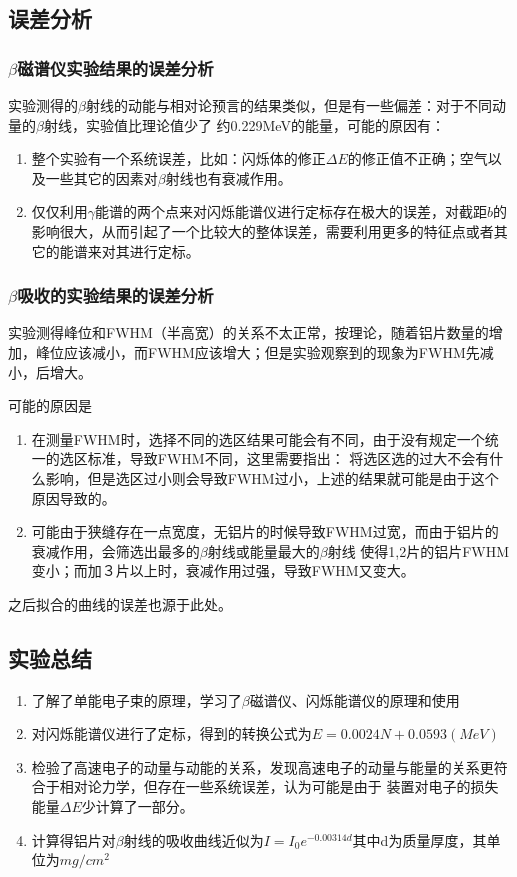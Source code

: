 \documentclass[a4paper,UTF8]{ctexart}
\begin{document}
\subsection{误差分析}

\subsubsection{$\beta$磁谱仪实验结果的误差分析}

实验测得的$\beta$射线的动能与相对论预言的结果类似，但是有一些偏差：对于不同动量的$\beta$射线，实验值比理论值少了
约0.229MeV的能量，可能的原因有：

\begin{enumerate}
    \item 整个实验有一个系统误差，比如：闪烁体的修正$\Delta E$的修正值不正确；空气以及一些其它的因素对$\beta$射线也有衰减作用。
    \item 仅仅利用$\gamma$能谱的两个点来对闪烁能谱仪进行定标存在极大的误差，对截距$b$的影响很大，从而引起了一个比较大的整体误差，需要利用更多的特征点或者其它的能谱来对其进行定标。
\end{enumerate}

\subsubsection{$\beta$吸收的实验结果的误差分析}

实验测得峰位和FWHM（半高宽）的关系不太正常，按理论，随着铝片数量的增加，峰位应该减小，而FWHM应该增大；但是实验观察到的现象为FWHM先减小，后增大。

可能的原因是

\begin{enumerate}
    \item 在测量FWHM时，选择不同的选区结果可能会有不同，由于没有规定一个统一的选区标准，导致FWHM不同，这里需要指出：
    将选区选的过大不会有什么影响，但是选区过小则会导致FWHM过小，上述的结果就可能是由于这个原因导致的。
    \item 可能由于狭缝存在一点宽度，无铝片的时候导致FWHM过宽，而由于铝片的衰减作用，会筛选出最多的$\beta$射线或能量最大的$\beta$射线
    使得1,2片的铝片FWHM变小；而加３片以上时，衰减作用过强，导致FWHM又变大。
\end{enumerate}

之后拟合的曲线的误差也源于此处。

\subsection{实验总结}

\begin{enumerate}
    \item 了解了单能电子束的原理，学习了$\beta$磁谱仪、闪烁能谱仪的原理和使用
    \item 对闪烁能谱仪进行了定标，得到的转换公式为$E = 0.0024N + 0.0593(MeV)$
    \item 检验了高速电子的动量与动能的关系，发现高速电子的动量与能量的关系更符合于相对论力学，但存在一些系统误差，认为可能是由于
    装置对电子的损失能量$\Delta E$少计算了一部分。
    \item 计算得铝片对$\beta$射线的吸收曲线近似为$I = I_0 e^{-0.00314d}$其中d为质量厚度，其单位为$mg/cm^2$
\end{enumerate}
\end{document}
